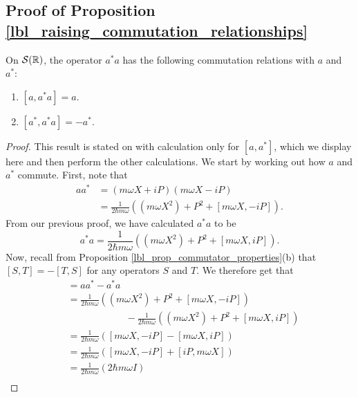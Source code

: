 \subsection{Proof of Proposition \eqref{lbl_raising_commutation_relationships}}\label{proof_lbl_raising_commutation_relationships}

\begin{proposition}
  On $\mathcal{S}(\mathbb{R})$, the operator $a^*a$ has the following commutation relations with $a$ and $a^*$:
  \begin{enumerate}[label=(\alph*)]
    \item $[a, a^* a] = a$.
    \item $[a^*, a^* a] = -a^*$.
  \end{enumerate}
\end{proposition}
\begin{proof}
  This result is stated on {{\cite[p.229]{Hall2013}}} with calculation only for $[a,a^*]$, which we display here and then perform the other calculations. We start by working out how $a$ and $a^*$ commute. First, note that
  \begin{align*}
    aa^*
    &= (m \omega  X + i P) (m \omega X - i P) \\
    &= \frac{1}{2 \hbar m \omega}\left( (m\omega X^2) + P^2 + [m \omega X, -i P] \right).
  \end{align*}
  From our previous proof, we have calculated $a^* a$ to be
  \begin{equation*}
    a^* a = \frac{1}{2 \hbar m \omega}\left( (m\omega X^2) + P^2 + [m \omega X, i P] \right).
  \end{equation*}
  Now, recall from Proposition \eqref{lbl_prop_commutator_properties}(b) that $[S, T] = -[T, S]$ for any operators $S$ and $T$. We therefore get that
  \begin{align*}
    [a, a^*]
    &= aa^* - a^*a \\
    &= \frac{1}{2 \hbar m \omega}\left( (m\omega X^2) + P^2 + [m \omega X, -i P] \right) \\&\qquad\qquad\qquad - \frac{1}{2 \hbar m \omega}\left( (m\omega X^2) + P^2 + [m \omega X, i P] \right)\\
    &=
      \frac{1}{2 \hbar m \omega}\left( [m \omega X, -iP] - [m \omega X, iP]\right) \\
    &=
      \frac{1}{2 \hbar m \omega}\left( [m \omega X, -iP] + [iP, m \omega X]\right) \\
    &=
        \frac{1}{2 \hbar m \omega}\left(2 \hbar m \omega I \right) \\

\end{align*}
\end{proof}
